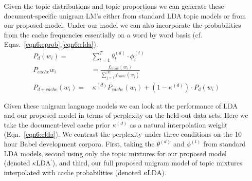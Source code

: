 Given the topic distributions and topic proportions we can generate these document-specific unigram LM's either from standard LDA topic models or from our proposed model.  Under our model we can also incorporate the probabilities from the cache frequencies essentially on a word by word basis (cf. Eqns.~\ref{eqn6:cprob},\ref{eqn6:clda}).
\begin{align}
P_d(w_i) =& \sum_{t=1}^T \theta^{(d)}_t \cdot \phi^{(t)}_i \label{eqn6:unigram} \\
P_{cache}{w_i} &= \frac{f_{cache}(w_i)}{\sum_{j=1}^{|V|}f_{cache}(w_j)} \label{eqn6:cprob} \\
P_{d+cache}(w_i) =& \,\kappa^{(d)} P_{cache}(w_i) + (1-\kappa^{(d)}) \cdot  P_{d}(w_i) \label{eqn6:clda}
\end{align}

Given these unigram language models we can look at the performance of LDA and our proposed model in terms of perplexity on the held-out data sets.  Here we take the document-level cache prior $\kappa^{(d)}$ as a natural interpolation weight (Eqn.~\ref{eqn6:clda}).  We contrast the perplexity under three conditions on the 10 hour Babel development corpora.  First, taking the $\theta^{(d)}$ and $\phi^{(t)}$ from standard LDA models, second using only the topic mixtures for our proposed model (denoted $\kappa$LDA$^\prime$), and third, our full proposed unigram model of topic mixtures interpolated with cache probabilities (denoted $\kappa$LDA).


